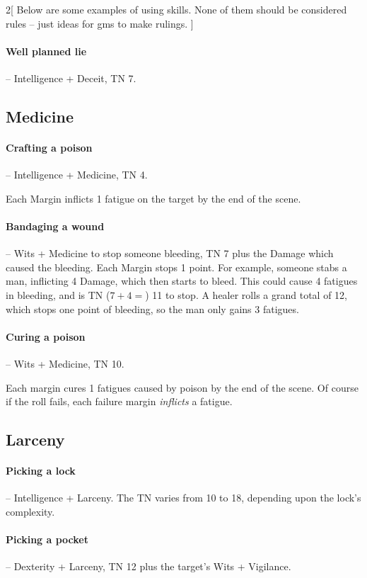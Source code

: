 \begin{multicols}{2}[
  Below are some examples of using skills.
  None of them should be considered rules -- just ideas for \glspl{gm} to make rulings.
]
\paragraph{Well planned lie} -- Intelligence + Deceit, TN 7.

\subsection{Medicine}

\paragraph{Crafting a poison} -- Intelligence + Medicine, TN 4.
\label{poison}

Each Margin inflicts 1 \gls{fatigue} on the target by the end of the scene.

\paragraph{Bandaging a wound} -- Wits + Medicine to stop someone bleeding, TN 7 plus the Damage which caused the bleeding.
Each Margin stops 1 point.
For example, someone stabs a man, inflicting 4 Damage, which then starts to bleed.
This could cause 4 \glspl{fatigue} in bleeding, and is TN ($7 + 4 = $) 11 to stop.
A healer rolls a grand total of 12, which stops one point of bleeding, so the man only gains 3 \glspl{fatigue}.

\paragraph{Curing a poison} -- Wits + Medicine, TN 10.

Each margin cures 1 \glspl{fatigue} caused by poison by the end of the scene.
Of course if the roll fails, each failure margin \emph{inflicts} a \gls{fatigue}.

\subsection{Larceny}

\paragraph{Picking a lock} -- Intelligence + Larceny.
The TN varies from 10 to 18, depending upon the lock's complexity.

\paragraph{Picking a pocket} -- Dexterity + Larceny, TN 12 plus the target's Wits + Vigilance.


\end{multicols}
